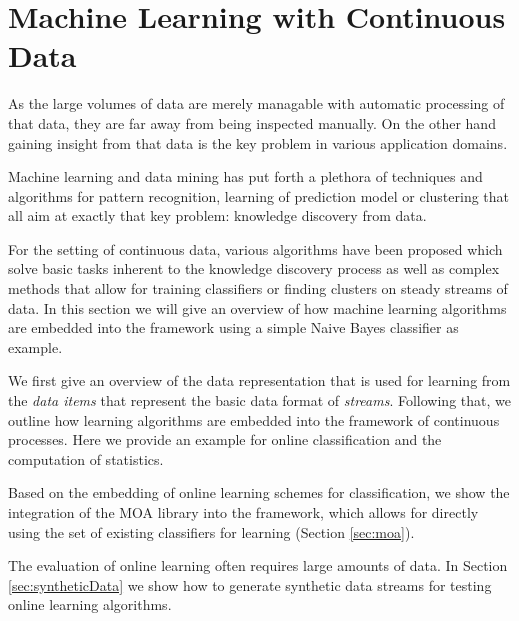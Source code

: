 \clearpage
\section{\label{sec:machineLearning}Machine Learning with Continuous Data}
As the large volumes of data are merely managable with automatic
processing of that data, they are far away from being inspected
manually. On the other hand gaining insight from that data is the key
problem in various application domains.

Machine learning and data mining has put forth a plethora of
techniques and algorithms for pattern recognition, learning of
prediction model or clustering that all aim at exactly that key
problem: knowledge discovery from data.

For the setting of continuous data, various algorithms have been
proposed which solve basic tasks inherent to the knowledge discovery
process as well as complex methods that allow for training classifiers
or finding clusters on steady streams of data. In this section we will
give an overview of how machine learning algorithms are embedded into
the \streams framework using a simple Naive Bayes classifier as example.

We first give an overview of the data representation that is used for
learning from the {\em data items} that represent the basic data format
of {\em streams}. Following that, we outline how learning algorithms are
embedded into the framework of continuous processes. Here we provide an
example for online classification and the computation of statistics.

Based on the embedding of online learning schemes for classification,
we show the integration of the MOA library into the \streams
framework, which allows for directly using the set of existing
classifiers for learning (Section \ref{sec:moa}).


The evaluation of online learning often requires large amounts of data.
In Section \ref{sec:syntheticData} we show how to generate synthetic data
streams for testing online learning algorithms.

